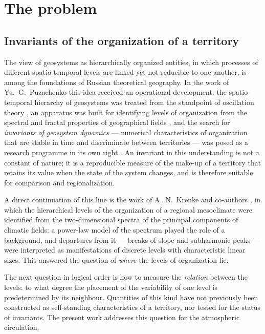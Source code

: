 \documentclass[11pt,a4paper]{article}
\begin{document}
\section{The problem}
\label{sec:intro}

\subsection{Invariants of the organization of a territory}

The view of geosystems as hierarchically organized entities, in which processes of different spatio-temporal levels are linked yet not reducible to one another, is among the foundations of Russian theoretical geography. In the work of Yu.~G.~Puzachenko this idea received an operational development: the spatio-temporal hierarchy of geosystems was treated from the standpoint of oscillation theory \cite{Puzachenko1986}, an apparatus was built for identifying levels of organization from the spectral and fractal properties of geographical fields \cite{Puzachenko2004}, and the search for \emph{invariants of geosystem dynamics} --- numerical characteristics of organization that are stable in time and discriminate between territories --- was posed as a research programme in its own right \cite{Puzachenko2010}. An invariant in this understanding is not a constant of nature; it is a reproducible measure of the make-up of a territory that retains its value when the state of the system changes, and is therefore suitable for comparison and regionalization.

A direct continuation of this line is the work of A.~N.~Krenke and co-authors \cite{Krenke2019}, in which the hierarchical levels of the organization of a regional mesoclimate were identified from the two-dimensional spectra of the principal components of climatic fields: a power-law model of the spectrum played the role of a background, and departures from it --- breaks of slope and subharmonic peaks --- were interpreted as manifestations of discrete levels with characteristic linear sizes. This answered the question of \emph{where} the levels of organization lie.

The next question in logical order is how to measure the \emph{relation} between the levels: to what degree the placement of the variability of one level is predetermined by its neighbour. Quantities of this kind have not previously been constructed as self-standing characteristics of a territory, nor tested for the status of invariants. The present work addresses this question for the atmospheric circulation.
\end{document}
